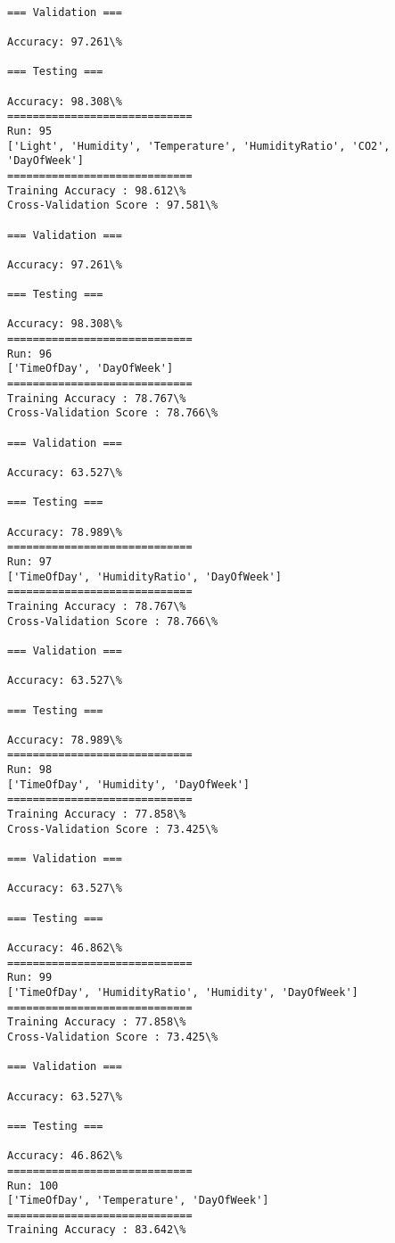 \documentclass[11pt]{article}
\begin{document}
    \begin{Verbatim}[commandchars=\\\{\}]

=== Validation ===

Accuracy: 97.261\%

=== Testing ===

Accuracy: 98.308\%
=============================
Run: 95
['Light', 'Humidity', 'Temperature', 'HumidityRatio', 'CO2', 'DayOfWeek']
=============================
Training Accuracy : 98.612\%
Cross-Validation Score : 97.581\%

=== Validation ===

Accuracy: 97.261\%

=== Testing ===

Accuracy: 98.308\%
=============================
Run: 96
['TimeOfDay', 'DayOfWeek']
=============================
Training Accuracy : 78.767\%
Cross-Validation Score : 78.766\%

=== Validation ===

Accuracy: 63.527\%

=== Testing ===

Accuracy: 78.989\%
=============================
Run: 97
['TimeOfDay', 'HumidityRatio', 'DayOfWeek']
=============================
Training Accuracy : 78.767\%
Cross-Validation Score : 78.766\%

=== Validation ===

Accuracy: 63.527\%

=== Testing ===

Accuracy: 78.989\%
=============================
Run: 98
['TimeOfDay', 'Humidity', 'DayOfWeek']
=============================
Training Accuracy : 77.858\%
Cross-Validation Score : 73.425\%

=== Validation ===

Accuracy: 63.527\%

=== Testing ===

Accuracy: 46.862\%
=============================
Run: 99
['TimeOfDay', 'HumidityRatio', 'Humidity', 'DayOfWeek']
=============================
Training Accuracy : 77.858\%
Cross-Validation Score : 73.425\%

=== Validation ===

Accuracy: 63.527\%

=== Testing ===

Accuracy: 46.862\%
=============================
Run: 100
['TimeOfDay', 'Temperature', 'DayOfWeek']
=============================
Training Accuracy : 83.642\%

    \end{Verbatim}
\end{document}
